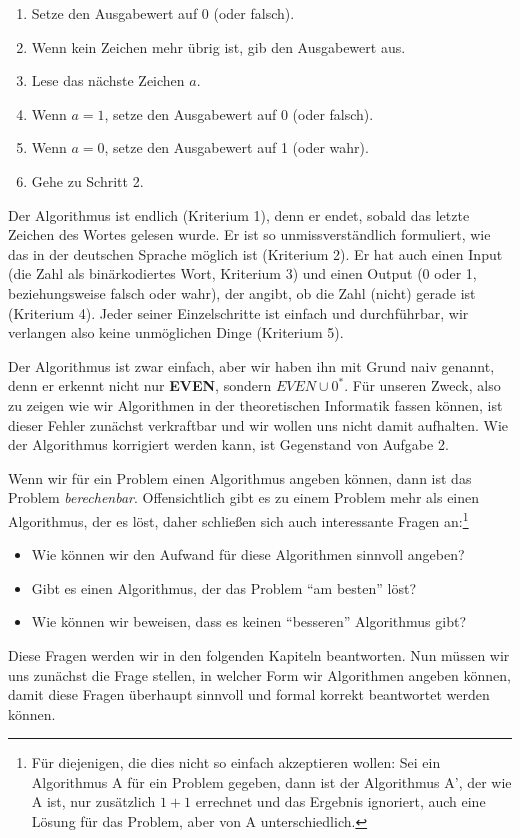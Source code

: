 \begin{enumerate}
    \item Setze den Ausgabewert auf 0 (oder falsch).
    \item Wenn kein Zeichen mehr übrig ist, gib den Ausgabewert aus.
    \item Lese das nächste Zeichen $a$.
    \item Wenn $a = 1$, setze den Ausgabewert auf 0 (oder falsch).
    \item Wenn $a = 0$, setze den Ausgabewert auf 1 (oder wahr).
    \item Gehe zu Schritt 2.
\end{enumerate}

Der Algorithmus ist endlich (Kriterium 1),
denn er endet,
sobald das letzte Zeichen des Wortes gelesen wurde.
Er ist so unmissverständlich formuliert,
wie das in der deutschen Sprache möglich ist (Kriterium 2).
Er hat auch einen Input (die Zahl als binärkodiertes Wort, Kriterium 3)
und einen Output (0 oder 1, beziehungsweise falsch oder wahr),
der angibt, ob die Zahl (nicht) gerade ist (Kriterium 4).
Jeder seiner Einzelschritte ist einfach und durchführbar,
wir verlangen also keine unmöglichen Dinge (Kriterium 5).

Der Algorithmus ist zwar einfach, aber wir haben ihn mit Grund naiv genannt,
denn er erkennt nicht nur \textbf{EVEN}, sondern $EVEN \cup 0^*$.
Für unseren Zweck,
also zu zeigen wie wir Algorithmen in der theoretischen Informatik fassen können,
ist dieser Fehler zunächst verkraftbar und wir wollen uns nicht damit aufhalten.
Wie der Algorithmus korrigiert werden kann,
ist Gegenstand von Aufgabe 2.

Wenn wir für ein Problem einen Algorithmus angeben können,
dann ist das Problem \emph{berechenbar}.
Offensichtlich gibt es zu einem Problem mehr als einen Algorithmus,
der es löst, daher schließen sich auch interessante Fragen an:\footnote{Für diejenigen, die dies nicht so einfach akzeptieren wollen:
Sei ein Algorithmus A für ein Problem gegeben, dann ist der Algorithmus A', der wie A ist,
nur zusätzlich $1+1$ errechnet und das Ergebnis ignoriert,
auch eine Lösung für das Problem, aber von A unterschiedlich.}
\begin{itemize}
    \item Wie können wir den Aufwand für diese Algorithmen sinnvoll angeben?
    \item Gibt es einen Algorithmus, der das Problem ``am besten'' löst?
    \item Wie können wir beweisen, dass es keinen ``besseren'' Algorithmus gibt?
\end{itemize}
Diese Fragen werden wir in den folgenden Kapiteln beantworten.
Nun müssen wir uns zunächst die Frage stellen,
in welcher Form wir Algorithmen angeben können,
damit diese Fragen überhaupt sinnvoll und formal korrekt beantwortet werden können.

